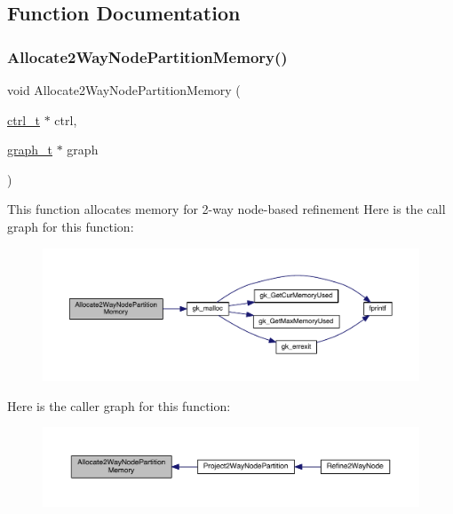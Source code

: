 \subsection{Function Documentation}
\mbox{\label{a00945_a843a5692564dc695b281647dc690c887}} 
\subsubsection{\texorpdfstring{Allocate2\+Way\+Node\+Partition\+Memory()}{Allocate2WayNodePartitionMemory()}}
{\footnotesize\ttfamily void Allocate2\+Way\+Node\+Partition\+Memory (\begin{DoxyParamCaption}\item[{\hyperlink{a00742}{ctrl\+\_\+t} $\ast$}]{ctrl,  }\item[{\hyperlink{a00734}{graph\+\_\+t} $\ast$}]{graph }\end{DoxyParamCaption})}

This function allocates memory for 2-\/way node-\/based refinement Here is the call graph for this function\+:\nopagebreak
\begin{figure}[H]
\begin{center}
\leavevmode
\includegraphics[width=350pt]{a00945_a843a5692564dc695b281647dc690c887_cgraph}
\end{center}
\end{figure}
Here is the caller graph for this function\+:\nopagebreak
\begin{figure}[H]
\begin{center}
\leavevmode
\includegraphics[width=350pt]{a00945_a843a5692564dc695b281647dc690c887_icgraph}
\end{center}
\end{figure}
\mbox{\label{a00945_aadcb666600c1f5ded03cdd998b6ffd8f}} 
